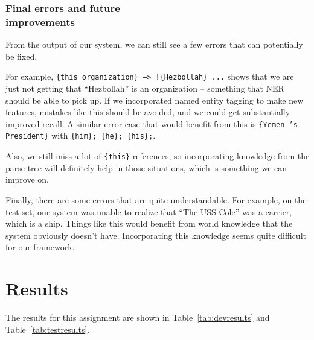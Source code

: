 \documentclass[12pt, twocolumn]{article}
\begin{document}
\subsubsection{Final errors and future\\ improvements}
From the output of our system, we can still see a few errors that can potentially be fixed.

For example, \texttt{\{this organization\} --> !\{Hezbollah\} ...} shows that we are just not getting that ``Hezbollah'' is an organization -- something that NER should be able to pick up. If we incorporated named entity tagging to make new features, mistakes like this should be avoided, and we could get substantially improved recall. A similar error case that would benefit from this is \texttt{\{Yemen 's President\}} with \texttt{\{him\}; \{he\}; \{his\};}.

Also, we still miss a lot of \texttt{\{this\}} references, so incorporating knowledge from the parse tree will definitely help in those situations, which is something we can improve on.

Finally, there are some errors that are quite understandable. For example, on the test set, our system was unable to realize that ``The USS Cole'' was a carrier, which is a ship. Things like this would benefit from world knowledge that the system obviously doesn't have. Incorporating this knowledge seems quite difficult for our framework.
\section{Results}
The results for this assignment are shown in Table~\ref{tab:devresults} and Table~\ref{tab:testresults}.
\end{document}
